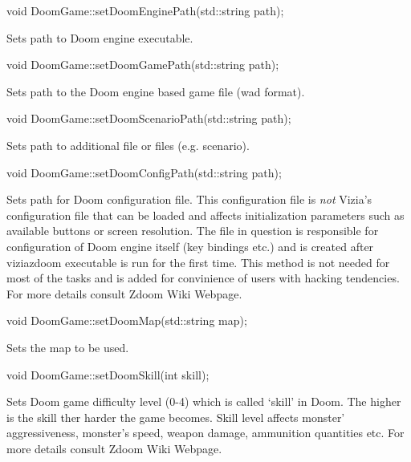 \vspace{20pt}
\begin{clinee}
void DoomGame::setDoomEnginePath(std::string path);
\end{clinee}

Sets path to Doom engine executable.


\vspace{20pt}
\begin{clinee}
void DoomGame::setDoomGamePath(std::string path);
\end{clinee}

Sets path to the Doom engine based game file (wad format).


\vspace{20pt}
\begin{clinee}
void DoomGame::setDoomScenarioPath(std::string path);
\end{clinee}
	Sets path to additional file or files (e.g. scenario).


\vspace{20pt}
\begin{clinee}
void DoomGame::setDoomConfigPath(std::string path);
\end{clinee}
	Sets path for Doom configuration file. This configuration file is \emph{not} Vizia's configuration file that can be loaded and affects initialization parameters such as available buttons or screen resolution. The file in question is responsible for configuration of Doom engine itself (key bindings etc.) and is created after viziazdoom executable is run for the first time. This method is not needed for most of the tasks and is added for convinience of users with hacking tendencies. For more details consult Zdoom Wiki Webpage\cite{zdoom-wiki}.

\vspace{20pt}
\begin{clinee}
void DoomGame::setDoomMap(std::string map);
\end{clinee}
	Sets the map to be used.


\vspace{20pt}
\begin{clinee}      
void DoomGame::setDoomSkill(int skill);
\end{clinee}
	Sets Doom game difficulty level (0-4) which is called `skill' in Doom. The higher is the skill ther harder the game becomes. Skill level affects monster' aggressiveness, monster's speed, weapon damage, ammunition quantities etc. For more details consult Zdoom Wiki Webpage\cite{zdoom-wiki}.



